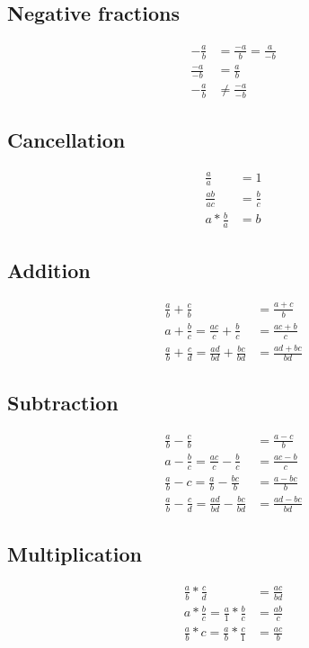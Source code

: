 \subsection{Negative fractions}
\begin{align*}
-\frac{a}{b}&=\frac{-a}{b}=\frac{a}{-b}\\
\frac{-a}{-b}&=\frac{a}{b}\\
-\frac{a}{b}&\neq \frac{-a}{-b}
\end{align*}
\subsection{Cancellation}
\begin{align*}
\frac{a}{a}&=1\\
\frac{ab}{ac}&=\frac{b}{c}\\
a*\frac{b}{a}&=b
\end{align*}
\subsection{Addition}
\begin{align*}
\frac{a}{b}+\frac{c}{b}&=\frac{a+c}{b}\\
a+\frac{b}{c}=\frac{ac}{c}+\frac{b}{c}&=\frac{ac+b}{c}\\
\frac{a}{b}+\frac{c}{d}=\frac{ad}{bd}+\frac{bc}{bd}&=\frac{ad+bc}{bd}
\end{align*}
\subsection{Subtraction}
\begin{align*}
\frac{a}{b}-\frac{c}{b}&=\frac{a-c}{b}\\
a-\frac{b}{c}=\frac{ac}{c}-\frac{b}{c}&=\frac{ac-b}{c}\\
\frac{a}{b}-c=\frac{a}{b}-\frac{bc}{b}&=\frac{a-bc}{b}\\
\frac{a}{b}-\frac{c}{d}=\frac{ad}{bd}-\frac{bc}{bd}&=\frac{ad-bc}{bd}
\end{align*}
\subsection{Multiplication}
\begin{align*}
\frac{a}{b}*\frac{c}{d}&=\frac{ac}{bd}\\
a*\frac{b}{c}=\frac{a}{1}*\frac{b}{c}&=\frac{ab}{c}\\
\frac{a}{b}*c=\frac{a}{b}*\frac{c}{1}&=\frac{ac}{b}
\end{align*}
